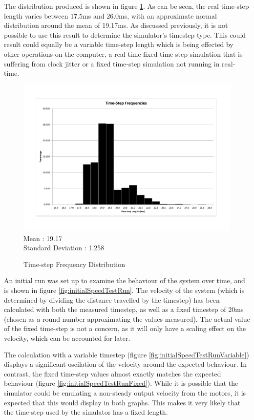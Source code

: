 \documentclass[10pt]{article}
\begin{document}
The distribution produced is shown in figure \ref{fig:timestepDistribution}.  As can be seen, the real time-step length varies between 17.5ms and 26.0ms, with an approximate normal distribution around the mean of 19.17ms.  As discussed previously, it is not possible to use this result to determine the simulator's timestep type. This could result could equally be a variable time-step length which is being effected by other operations on the computer, a real-time fixed time-step simulation that is suffering from clock jitter or a fixed time-step simulation not running in real-time.

\begin{figure}
 \includegraphics[width=\textwidth]{Images/time-step-length-distribution} \\
 Mean : 19.17 \\
 Standard Deviation : 1.258

 \caption{Time-step Frequency Distribution}
 \label{fig:timestepDistribution}
\end{figure}

An initial run was set up to examine the behaviour of the system over time, and is shown in figure \ref{fig:initialSpeedTestRun}.  The velocity of the system (which is determined by dividing the distance travelled by the timestep) has been calculated with both the measured timestep, as well as a fixed timestep of 20ms (chosen as a round number approximating the values measured). The actual value of the fixed time-step is not a concern, as it will only have a scaling effect on the velocity, which can be accounted for later.

The calculation with a variable timestep (figure \ref{fig:initialSpeedTestRunVariable}) displays a significant oscilation of the velocity around the expected behaviour.  In contrast, the fixed time-step values almost exactly matches the expected behaviour (figure \ref{fig:initialSpeedTestRunFixed}).  While it is possible that the simulator could be emulating a non-steady output velocity from the motors, it is expected that this would display in both graphs.  This makes it very likely that the time-step used by the simulator has a fixed length.
\end{document}
